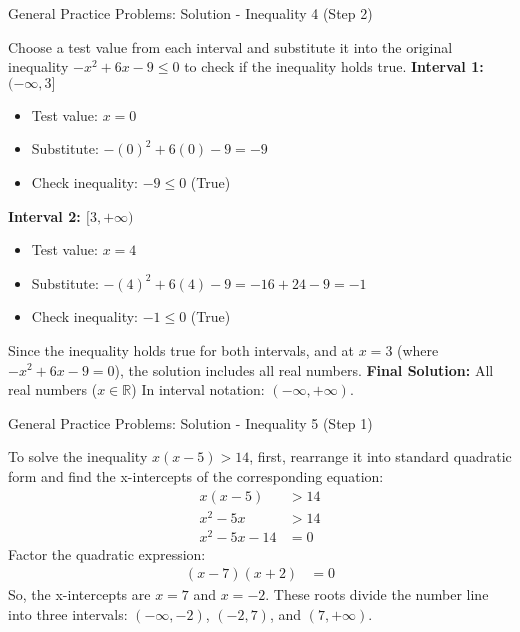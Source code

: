 \documentclass[aspectratio=169]{beamer}
\begin{document}
\begin{frame}{General Practice Problems: Solution - Inequality 4 (Step 2)}
    \begin{tcolorbox}[colback=lightgray,colframe=accent,title=Solution: $-x^2 + 6x - 9 \leq 0$ (Step 2 - Use Test Values and Final Solution)]
        \footnotesize
        Choose a test value from each interval and substitute it into the original inequality $-x^2 + 6x - 9 \leq 0$ to check if the inequality holds true.
        \newline
        \textbf{Interval 1: $(-\infty, 3]$}
        \begin{itemize}
            \item Test value: $x=0$
            \item Substitute: $-(0)^2 + 6(0) - 9 = -9$
            \item Check inequality: $-9 \leq 0$ (True)
        \end{itemize}
        \newline
        \textbf{Interval 2: $[3, +\infty)$}
        \begin{itemize}
            \item Test value: $x=4$
            \item Substitute: $-(4)^2 + 6(4) - 9 = -16 + 24 - 9 = -1$
            \item Check inequality: $-1 \leq 0$ (True)
        \end{itemize}
        \newline
        Since the inequality holds true for both intervals, and at $x=3$ (where $-x^2+6x-9 = 0$), the solution includes all real numbers.
        \newline
        \textbf{Final Solution:} All real numbers ($x \in \mathbb{R}$)
        In interval notation: $(-\infty, +\infty)$.
    \end{tcolorbox}
\end{frame}

\begin{frame}{General Practice Problems: Solution - Inequality 5 (Step 1)}
    \begin{tcolorbox}[colback=lightgray,colframe=accent,title=Solution: $x(x-5) > 14$ (Step 1 - Find X-intercepts)]
        \footnotesize
        To solve the inequality $x(x-5) > 14$, first, rearrange it into standard quadratic form and find the x-intercepts of the corresponding equation:
        \begin{align*}
            x(x-5) &> 14 \\
            x^2 - 5x &> 14 \\
            x^2 - 5x - 14 &= 0
        \end{align*}
        Factor the quadratic expression:
        \begin{align*}
            (x-7)(x+2) &= 0
        \end{align*}
        So, the x-intercepts are $x=7$ and $x=-2$.
        These roots divide the number line into three intervals: $(-\infty, -2)$, $(-2, 7)$, and $(7, +\infty)$.
    \end{tcolorbox}
\end{frame}
\end{document}
